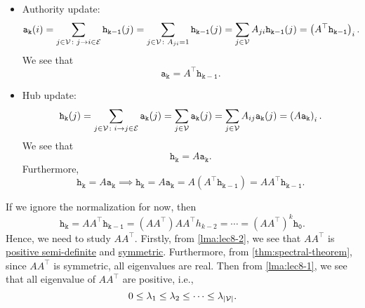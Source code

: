 \begin{itemize}
	\item Authority update:
	      \[
		      \mathtt{a_k(\mathnormal{i})}  = \sum\limits_{j\in \mathcal{V}\colon j\to i\in \mathcal{E}}\mathtt{h_{k-1}(\mathnormal{j})}
		      =\sum\limits_{j\in\mathcal{V}\colon A_{ji} = 1}\mathtt{h_{k-1}(\mathnormal{j})}
		      =\sum\limits_{j\in\mathcal{V}}A_{ji}\mathtt{h_{k-1}(\mathnormal{j})}
		      = \left(A^{\top} \mathtt{h_{k-1}}\right)_i.
	      \]
	      We see that
	      \[
		      \mathtt{a_k} = A^{\top}\mathtt{h_{k-1}}.
	      \]
	\item Hub update:
	      \[
		      \mathtt{h_k(\mathnormal{j})} = \sum\limits_{j\in\mathcal{V}\colon i\to j\in\mathcal{E}} \mathtt{a_k(\mathnormal{j})}
		      = \sum\limits_{j\in\mathcal{V}} \mathtt{a_k(\mathnormal{j})}
		      = \sum\limits_{j\in\mathcal{V} }A_{ij}\mathtt{a_k(\mathnormal{j})}
		      = \left(A\mathtt{a_k}\right)_i.
	      \]
	      We see that
	      \[
		      \mathtt{h_{k}} = A \mathtt{a_{k}}.
	      \]
	      Furthermore,
	      \[
		      \mathtt{h_k} = A\mathtt{a_k}\implies \mathtt{h_k}= A\mathtt{a_k} = A(A^{\top}\mathtt{h_{k-1}}) = A A^{\top} \mathtt{h_{k-1}}.
	      \]
\end{itemize}
If we ignore the normalization for now, then
\[
	\mathtt{h_k} = A A^{\top}\mathtt{h_{k-1}} = (A A^{\top})A A^{\top} h_{k-2} = \cdots = (A A^{\top})^k \mathtt{h_0}.
\]
Hence, we need to study \(A A^{\top}\). Firstly, from \autoref{lma:lec8-2}, we see that \(A A^{\top} \) is \hyperref[def:positive-semi-definite]{positive semi-definite}
and \hyperref[def:symmetric-matrix]{symmetric}. Furthermore, from \autoref{thm:spectral-theorem}, since \(A A^{\top} \) is symmetric, all eigenvalues are real. Then
from \autoref{lma:lec8-1}, we see that all eigenvalue of \(A A^{\top} \) are positive, i.e.,
\[
	0 \leq \lambda_1 \leq \lambda_2 \leq \cdots \leq \lambda_{\left\vert \mathcal{\MakeUppercase{v}} \right\vert } .
\]

